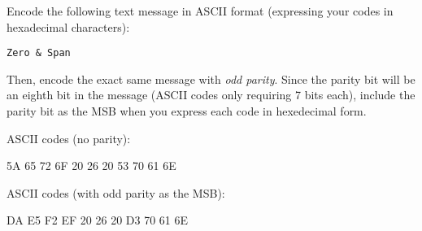 

Encode the following text message in ASCII format (expressing your codes in hexadecimal characters):

\vskip 10pt

\centerline{\tt Zero \& Span} 

\vskip 50pt

Then, encode the exact same message with {\it odd parity}.  Since the parity bit will be an eighth bit in the message (ASCII codes only requiring 7 bits each), include the parity bit as the MSB when you express each code in hexedecimal form.

\vskip 50pt







\noindent
ASCII codes (no parity):

\vskip 10pt

5A 65 72 6F 20 26 20 53 70 61 6E

\vskip 30pt

\noindent
ASCII codes (with odd parity as the MSB):

\vskip 10pt

DA E5 F2 EF 20 26 20 D3 70 61 6E











